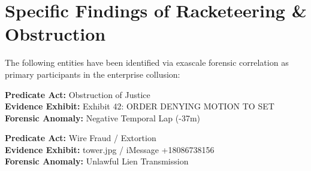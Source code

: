 \section{Specific Findings of Racketeering & Obstruction}
The following entities have been identified via exascale forensic correlation as primary participants in the enterprise collusion:

\begin{tcolorbox}[title=Scot Stuart Brower]
\textbf{Predicate Act:} Obstruction of Justice\\
\textbf{Evidence Exhibit:} Exhibit 42: ORDER DENYING MOTION TO SET\\
\textbf{Forensic Anomaly:} Negative Temporal Lap (-37m)
\end{tcolorbox}

\begin{tcolorbox}[title=All Island Transportation]
\textbf{Predicate Act:} Wire Fraud / Extortion\\
\textbf{Evidence Exhibit:} tower.jpg / iMessage +18086738156\\
\textbf{Forensic Anomaly:} Unlawful Lien Transmission
\end{tcolorbox}

